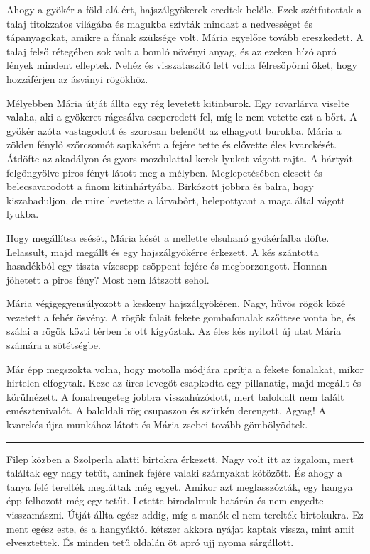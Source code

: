 \documentclass[10pt]{memoir}
\renewcommand{\pfbreakdisplay}{\bigskip \ding{166} \bigskip}
\newcommand{\secbreak}{\fancybreak{\pfbreakdisplay}\indent}
\begin{document}
Ahogy a gyökér a föld alá ért, hajszálgyökerek eredtek belőle. Ezek
szétfutottak a talaj titokzatos világába és magukba szívták mindazt a
nedvességet és tápanyagokat, amikre a fának szüksége volt. Mária egyelőre
tovább ereszkedett. A talaj felső rétegében sok volt a bomló növényi anyag, és
az ezeken hízó apró lények mindent elleptek. Nehéz és visszataszító lett volna
félresöpörni őket, hogy hozzáférjen az ásványi rögökhöz.

Mélyebben Mária útját állta egy rég levetett kitinburok. Egy rovarlárva viselte
valaha, aki a gyökeret rágcsálva cseperedett fel, míg le nem vetette ezt a
bőrt. A gyökér azóta vastagodott és szorosan belenőtt az elhagyott burokba.
Mária a zölden fénylő szőrcsomót sapkaként a fejére tette és elővette éles
kvarckését. Átdöfte az akadályon és gyors mozdulattal kerek lyukat vágott
rajta. A hártyát felgöngyölve piros fényt látott meg a mélyben. Meglepetésében
elesett és belecsavarodott a finom kitinhártyába. Birkózott jobbra és balra,
hogy kiszabaduljon, de mire levetette a lárvabőrt, belepottyant a maga által
vágott lyukba.

Hogy megállítsa esését, Mária kését a mellette elsuhanó gyökérfalba döfte.
Lelassult, majd megállt és egy hajszálgyökérre érkezett. A kés szántotta
hasadékból egy tiszta vízcsepp csöppent fejére és megborzongott. Honnan
jöhetett a piros fény? Most nem látszott sehol.

Mária végigegyensúlyozott a keskeny hajszálgyökéren. Nagy, hűvös rögök közé
vezetett a fehér ösvény. A rögök falait fekete gombafonalak szőttese vonta be,
és szálai a rögök közti térben is ott kígyóztak. Az éles kés nyitott új utat
Mária számára a sötétségbe.

Már épp megszokta volna, hogy motolla módjára aprítja a fekete fonalakat, mikor
hirtelen elfogytak. Keze az üres levegőt csapkodta egy pillanatig, majd megállt
és körülnézett. A fonalrengeteg jobbra visszahúzódott, mert baloldalt nem
talált emésztenivalót. A baloldali rög csupaszon és szürkén derengett. Agyag! A
kvarckés újra munkához látott és Mária zsebei tovább gömbölyödtek.

\secbreak

Filep közben a Szolperla alatti birtokra érkezett. Nagy volt itt az izgalom,
mert találtak egy nagy tetűt, aminek fejére valaki szárnyakat kötözött. És
ahogy a tanya felé terelték megláttak még egyet. Amikor azt meglasszózták, egy
hangya épp felhozott még egy tetűt. Letette birodalmuk határán és nem engedte
visszamászni. Útját állta egész addig, míg a manók el nem terelték birtokukra.
Ez ment egész este, és a hangyáktól kétszer akkora nyájat kaptak vissza, mint
amit elvesztettek. És minden tetű oldalán öt apró ujj nyoma sárgállott.
\end{document}
